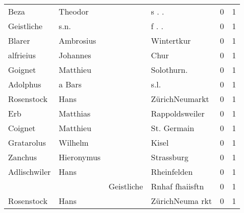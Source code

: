 \begin{tabular}{llllrr}
                     Beza &                            Theodor &             &                                      s . .  &          0 &         1 \\
               Geistliche &                               s.n. &             &                                      f . .  &          0 &         1 \\
                   Blarer &                          Ambrosius &             &                                  Wintertkur &          0 &         1 \\
                alfrieius &                           Johannes &             &                                        Chur &          0 &         1 \\
                  Goignet &                           Matthieu &             &                                 Solothurn.  &          0 &         1 \\
                 Adolphus &                             a Bars &             &                                        s.l. &          0 &         1 \\
               Rosenstock &                               Hans &             &                              ZürichNeumarkt &          0 &         1 \\
                      Erb &                           Matthias &             &                              Rappoldsweiler &          0 &         1 \\
                  Coignet &                           Matthieu &             &                                 St. Germain &          0 &         1 \\
               Gratarolus &                            Wilhelm &             &                                       Kisel &          0 &         1 \\
                  Zanchus &                         Hieronymus &             &                                  Strassburg &          0 &         1 \\
             Adlischwiler &                               Hans &             &                                 Rheinfelden &          0 &         1 \\
                          &                                    &  Geistliche &                             Rnhaf fhaiisftn &          0 &         1 \\
               Rosenstock &                               Hans &             &                             ZürichNeuma rkt &          0 &         1 \\

\end{tabular}
